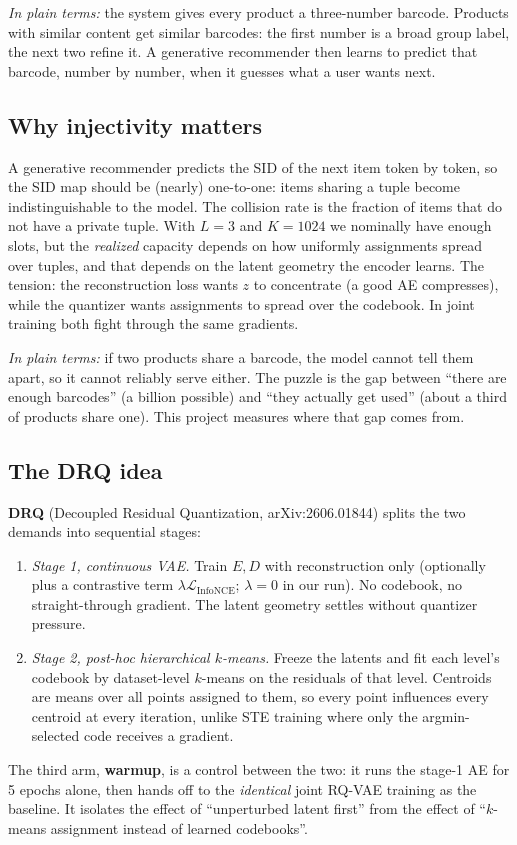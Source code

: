 \documentclass[11pt]{article}
\begin{document}
\emph{In plain terms:} the system gives every product a three-number barcode.
Products with similar content get similar barcodes: the first number is a broad
group label, the next two refine it. A generative recommender then learns to
predict that barcode, number by number, when it guesses what a user wants next.

\subsection{Why injectivity matters}

A generative recommender predicts the SID of the next item token by token, so
the SID map should be (nearly) one-to-one: items sharing a tuple become
indistinguishable to the model. The collision rate is the fraction of items that
do not have a private tuple. With $L=3$ and $K=1024$ we nominally have enough
slots, but the \emph{realized} capacity depends on how uniformly assignments
spread over tuples, and that depends on the latent geometry the encoder learns.
The tension: the reconstruction loss wants $z$ to concentrate (a good AE
compresses), while the quantizer wants assignments to spread over the codebook.
In joint training both fight through the same gradients.

\emph{In plain terms:} if two products share a barcode, the model cannot tell
them apart, so it cannot reliably serve either. The puzzle is the gap between
``there are enough barcodes'' (a billion possible) and ``they actually get
used'' (about a third of products share one). This project measures where that
gap comes from.

\subsection{The DRQ idea}

\textbf{DRQ} (Decoupled Residual Quantization, arXiv:2606.01844) splits the two
demands into sequential stages:
\begin{enumerate}[nosep]
  \item \emph{Stage 1, continuous VAE.} Train $E, D$ with reconstruction only
  (optionally plus a contrastive term $\lambda \mathcal{L}_{\mathrm{InfoNCE}}$;
  $\lambda = 0$ in our run). No codebook, no straight-through gradient. The
  latent geometry settles without quantizer pressure.
  \item \emph{Stage 2, post-hoc hierarchical $k$-means.} Freeze the latents and
  fit each level's codebook by dataset-level $k$-means on the residuals of that
  level. Centroids are means over all points assigned to them, so every point
  influences every centroid at every iteration, unlike STE training where only
  the argmin-selected code receives a gradient.
\end{enumerate}
The third arm, \textbf{warmup}, is a control between the two: it runs the stage-1
AE for 5 epochs alone, then hands off to the \emph{identical} joint RQ-VAE
training as the baseline. It isolates the effect of ``unperturbed latent first''
from the effect of ``$k$-means assignment instead of learned codebooks''.
\end{document}
